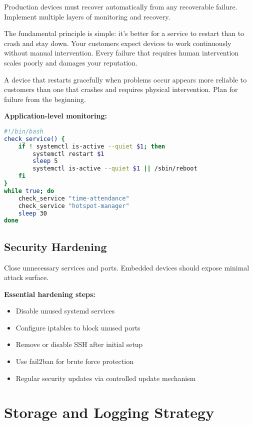 Production devices must recover automatically from any recoverable failure. Implement multiple layers of monitoring and recovery.

The fundamental principle is simple: it's better for a service to restart than to crash and stay down. Your customers expect devices to work continuously without manual intervention. Every failure that requires human intervention scales poorly and damages your reputation.

A device that restarts gracefully when problems occur appears more reliable to customers than one that crashes and requires physical intervention. Plan for failure from the beginning.

\textbf{Application-level monitoring:}
\begin{tcolorbox}[colback=gray!5,colframe=gray!50,title=Simple Watchdog Script]
\begin{lstlisting}[language=bash,basicstyle=\small\ttfamily]
#!/bin/bash
check_service() {
    if ! systemctl is-active --quiet $1; then
        systemctl restart $1
        sleep 5
        systemctl is-active --quiet $1 || /sbin/reboot
    fi
}
while true; do
    check_service "time-attendance"
    check_service "hotspot-manager"
    sleep 30
done
\end{lstlisting}
\end{tcolorbox}

\subsection{Security Hardening}

Close unnecessary services and ports. Embedded devices should expose minimal attack surface.

\textbf{Essential hardening steps:}
\begin{itemize}
\item Disable unused systemd services
\item Configure iptables to block unused ports
\item Remove or disable SSH after initial setup
\item Use fail2ban for brute force protection
\item Regular security updates via controlled update mechanism
\end{itemize}

\section{Storage and Logging Strategy}

